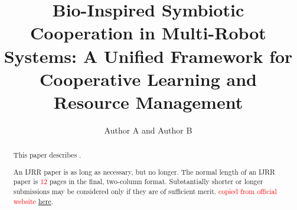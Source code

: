 \documentclass[Afour,sageh,times]{sagej}
\begin{document}

\title{Bio-Inspired Symbiotic Cooperation in Multi-Robot Systems: A Unified Framework for Cooperative Learning and Resource Management}

\author{Author A and Author B} %
 


\begin{abstract}
This paper describes .

An IJRR paper is as long as necessary, but no longer. The normal length of an IJRR paper is \textcolor{red}{12} pages in the final, two-column format. Substantially shorter or longer submissions may be considered only if they are of sufficient merit. \textcolor{red}{copied from official website \href{https://journals.sagepub.com/author-instructions/IJR}{here}}.
\end{abstract}


\maketitle
\end{document}
